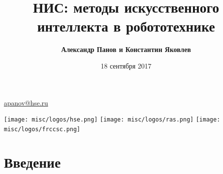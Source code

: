 \documentclass[default]{beamer}
\begin{document}
	
	\title[РобоНИС]{НИС: методы искусственного интеллекта в робототехнике}
	\author[Панов, Яковлев]{\textbf{Александр Панов и Константин Яковлев}}
	\date{18 сентября 2017} 
	
	{
	\begin{frame}
		
		\titlepage
		\centering
		\href{mailto:apanov@hse.ru}{apanov@hse.ru}
		
		\texttt{[image: misc/logos/hse.png]} \hspace{10pt}
		\texttt{[image: misc/logos/ras.png]} \hspace{10pt}
		\texttt{[image: misc/logos/frccsc.png]}
		
	\end{frame}
	}	

	\section{Введение}
\end{document}
